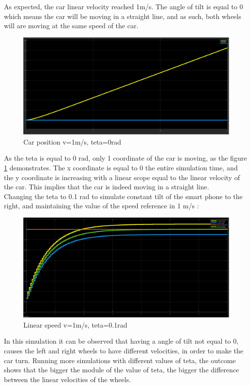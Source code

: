  As expected, the car linear velocity reached 1m/s. The angle of tilt is equal to 0 which means the car will be moving in a straight line, and as such, both wheels will are moving at the same speed of the car.\\
\newpage
\begin{figure}[!h]
\centering
\includegraphics[width=1.0\textwidth]{./img/xy10.png}
\caption {\label{fig:sim1 - pos}Car position v=1m/s, teta=0rad}
\end{figure}
As the teta is equal to 0 rad, only 1 coordinate of the car is moving, as the figure \ref{fig:sim1 - pos} demonstrates. The x coordinate is equal to 0 the entire simulation time, and the y coordinate is increasing with a linear scope equal to the linear velocity of the car. This implies that the car is indeed moving in a straight line.\\
\newpage
Changing the teta to 0.1 rad to simulate constant tilt of the smart phone to the right, and maintaining the value of the speed reference in 1 m/s :\
\begin{figure}[!h]
\centering
\includegraphics[width=1.0\textwidth]{./img/vel101.png}
\caption {\label{fig:sim2 - vel}Linear speed v=1m/s, teta=0.1rad}
\end{figure}
In this simulation it can be observed that having a angle of tilt not equal to 0, causes the left and right wheels to have different velocities, in order to make the car turn. Running more simulations with different values of teta, the outcome shows that the bigger the module of the value of teta, the bigger the difference between the linear velocities of the wheels.
